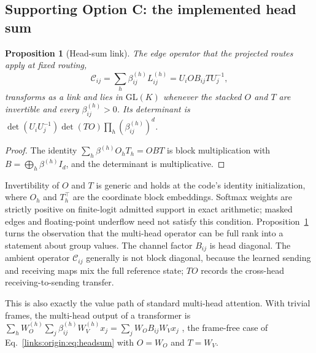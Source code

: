 \documentclass[11pt]{article}
\newtheorem{proposition}[theorem]{Proposition}
\theoremstyle{definition}
\theoremstyle{remark}
\providecommand{\GL}{\mathrm{GL}}
\begin{document}
\subsection{Supporting Option C: the implemented head sum}
\label{links:origin:sec:headsum}

\begin{proposition}[Head-sum link]
\label{links:origin:prop:headsum}
The edge operator that the projected routes apply at fixed routing,
\begin{equation}
\mathcal C_{ij}=\sum_h\beta_{ij}^{(h)}L_{ij}^{(h)}=U_iOB_{ij}TU_j^{-1},
\label{links:origin:eq:headsum}
\end{equation}
transforms as a link and lies in $\GL(K)$ whenever the stacked $O$ and $T$ are invertible and every $\beta_{ij}^{(h)}>0$. Its determinant is $\det(U_iU_j^{-1})\det(TO)\prod_h(\beta_{ij}^{(h)})^d$.
\end{proposition}

\begin{proof}
The identity $\sum_h\beta^{(h)}O_hT_h=OB T$ is block multiplication with $B=\bigoplus_h\beta^{(h)}I_d$, and the determinant is multiplicative.
\end{proof}

Invertibility of $O$ and $T$ is generic and holds at the code's identity initialization, where $O_h$ and $T_h^\top$ are the coordinate block embeddings. Softmax weights are strictly positive on finite-logit admitted support in exact arithmetic; masked edges and floating-point underflow need not satisfy this condition. Proposition~\ref{links:origin:prop:headsum} turns the observation that the multi-head operator can be full rank into a statement about group values. The channel factor $B_{ij}$ is head diagonal. The ambient operator $\mathcal C_{ij}$ generally is not block diagonal, because the learned sending and receiving maps mix the full reference state; $TO$ records the cross-head receiving-to-sending transfer.

This is also exactly the value path of standard multi-head attention. With trivial frames, the multi-head output of a transformer is $\sum_hW_O^{(h)}\sum_j\beta_{ij}^{(h)}W_V^{(h)}x_j=\sum_jW_OB_{ij}W_Vx_j$ \cite{links:vaswani2017}, the frame-free case of Eq.~\eqref{links:origin:eq:headsum} with $O=W_O$ and $T=W_V$.
\end{document}
